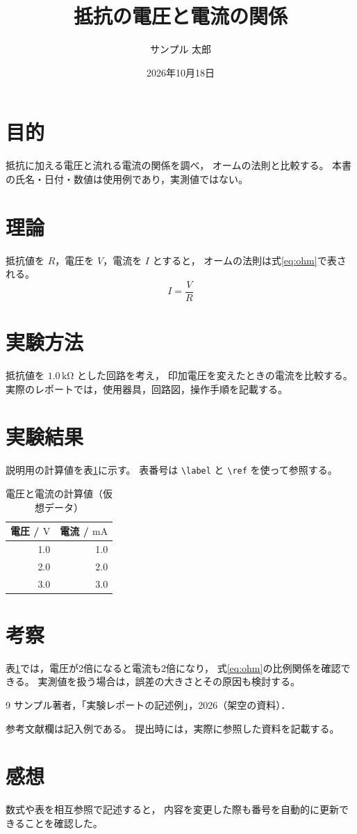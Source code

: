 \documentclass[uplatex,dvipdfmx,titlepage,a4j]{jsarticle}
\title{抵抗の電圧と電流の関係}
\author{サンプル 太郎}
\date{2026年10月18日}
\begin{document}
\maketitle

\section{目的}
抵抗に加える電圧と流れる電流の関係を調べ，
オームの法則と比較する。
本書の氏名・日付・数値は使用例であり，実測値ではない。

\section{理論}
抵抗値を \(R\)，電圧を \(V\)，電流を \(I\) とすると，
オームの法則は式\eqref{eq:ohm}で表される。
\begin{equation}
  I = \frac{V}{R}
  \label{eq:ohm}
\end{equation}

\section{実験方法}
抵抗値を \(1.0\,\mathrm{k\Omega}\) とした回路を考え，
印加電圧を変えたときの電流を比較する。
実際のレポートでは，使用器具，回路図，操作手順を記載する。

\section{実験結果}
説明用の計算値を表\ref{tab:values}に示す。
表番号は \verb|\label| と \verb|\ref| を使って参照する。
\begin{table}[htbp]
  \centering
  \caption{電圧と電流の計算値（仮想データ）}
  \label{tab:values}
  \begin{tabular}{rr}
    \hline
    電圧 / \(\mathrm{V}\) & 電流 / \(\mathrm{mA}\) \\
    \hline
    1.0 & 1.0 \\
    2.0 & 2.0 \\
    3.0 & 3.0 \\
    \hline
  \end{tabular}
\end{table}

\section{考察}
表\ref{tab:values}では，電圧が2倍になると電流も2倍になり，
式\eqref{eq:ohm}の比例関係を確認できる。
実測値を扱う場合は，誤差の大きさとその原因も検討する。

\begin{thebibliography}{9}
    サンプル著者，「実験レポートの記述例」，2026（架空の資料）．
\end{thebibliography}
参考文献欄は記入例である。
提出時には，実際に参照した資料を記載する。

\section*{感想}
数式や表を相互参照で記述すると，
内容を変更した際も番号を自動的に更新できることを確認した。
\end{document}
